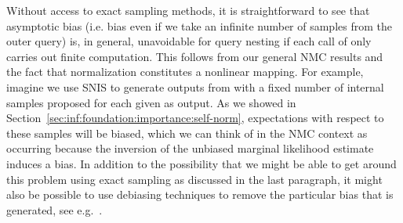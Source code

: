 

Without access to exact sampling methods, it is straightforward to see 
that asymptotic bias (i.e. bias even if we take
an infinite number of samples from the outer query) is, in general, unavoidable for
query nesting if each call of \conditional only carries out finite computation.  
This follows from our general NMC results and
the fact that normalization constitutes a nonlinear mapping.
For example, imagine we
use SNIS to generate outputs from \conditional
with a fixed number of internal samples proposed for each given as output.  As we showed in 
Section~\ref{sec:inf:foundation:importance:self-norm}, expectations with respect to these samples will be
biased, which we can think of in the NMC context as occurring because the inversion of the unbiased marginal likelihood estimate
induces a bias.  In addition to the possibility that we might be able to get around this
problem using exact sampling as discussed in the last paragraph, it might also be possible to
use debiasing techniques to remove the particular bias that is generated, see e.g.~\cite{glynn2014exact,jacob2017smoothing}.

